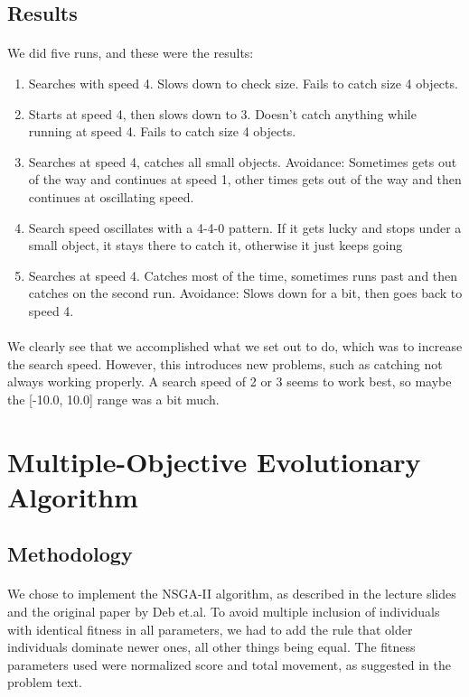 \documentclass[a4paper,12pt]{article}
\begin{document}
\subsection{Results}
\paragraph{}We did five runs, and these were the results:
\begin{enumerate}
\item{Searches with speed 4. Slows down to check size. Fails to catch size 4 objects.}
\item{Starts at speed 4, then slows down to 3. Doesn't catch anything while running at speed 4. Fails to catch size 4 objects.}
\item{Searches at speed 4, catches all small objects. Avoidance: Sometimes gets out of the way and continues at speed 1, other times gets out of the way and then continues at oscillating speed.}
\item{Search speed oscillates with a 4-4-0 pattern. If it gets lucky and stops under a small object, it stays there to catch it, otherwise it just keeps going}
\item{Searches at speed 4. Catches most of the time, sometimes runs past and then catches on the second run. Avoidance: Slows down for a bit, then goes back to speed 4.}
\end{enumerate}
\paragraph{}We clearly see that we accomplished what we set out to do, which was to increase the search speed. However, this introduces new problems, such as catching not always working properly. A search speed of 2 or 3 seems to work best, so maybe the [-10.0, 10.0] range was a bit much.

\section{Multiple-Objective Evolutionary Algorithm}
\subsection{Methodology}
\paragraph{}We chose to implement the NSGA-II algorithm, as described in the lecture slides and the original paper by Deb et.al. To avoid multiple inclusion of individuals with identical fitness in all parameters, we had to add the rule that older individuals dominate newer ones, all other things being equal. The fitness parameters used were normalized score and total movement, as suggested in the problem text.
\end{document}
